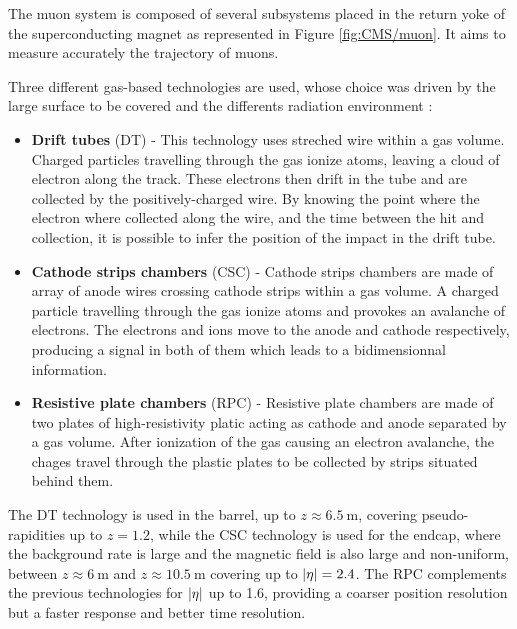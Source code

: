         The muon system is composed of several subsystems placed in the return yoke of
        the superconducting magnet as represented in Figure \ref{fig:CMS/muon}. It aims to
        measure accurately the trajectory of muons.


        Three different gas-based technologies are used, whose choice was driven by the
        large surface to be covered and the differents radiation environment :
        \begin{itemize}
            \item \textbf{Drift tubes} (DT) - This technology uses streched wire within
                a gas volume. Charged particles travelling through the gas ionize atoms,
                leaving a cloud of electron along the track. These electrons then drift
                in the tube and are collected by the positively-charged wire. By knowing
                the point where the electron where collected along the wire, and the
                time between the hit and collection, it is possible to infer the position
                of the impact in the drift tube.
            \item \textbf{Cathode strips chambers} (CSC) - Cathode strips chambers are
                made of array of anode wires crossing cathode strips within a gas volume.
                A charged particle travelling through the gas ionize atoms and provokes an
                avalanche of electrons. The electrons and ions move to the anode and
                cathode respectively, producing a signal in both of them which leads to
                a bidimensionnal information.
            \item \textbf{Resistive plate chambers} (RPC) - Resistive plate chambers are
                made of two plates of high-resistivity platic acting as cathode and anode
                separated by a gas volume. After ionization of the gas causing an
                electron avalanche, the chages travel through the plastic plates to be
                collected by strips situated behind them.
        \end{itemize}

        The DT technology is used in the barrel, up to $z \approx 6.5~\text{m}$, covering
        pseudo-rapidities up to $z = 1.2$, while the CSC technology is used for the endcap,
        where the background rate is large and the magnetic field is also large and non-uniform,
        between $z \approx 6~\text{m}$ and $z \approx 10.5~\text{m}$ covering up to $\left| \eta \right| = 2.4$.
        The RPC complements the previous technologies for $\left| \eta \right|$ up to 1.6, providing a
        coarser position resolution but a faster response and better time resolution.

